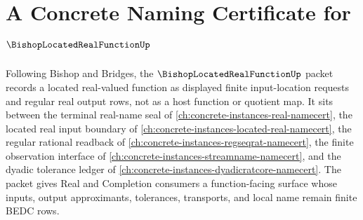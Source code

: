 \chapter{A Concrete Naming Certificate for $\BishopLocatedRealFunctionUp$}
\label{ch:concrete-instances-bishop-located-real-function-namecert}

Following Bishop and Bridges, the $\BishopLocatedRealFunctionUp$ packet records a located real-valued function as displayed finite input-location requests and regular real output rows, not as a host function or quotient map. It sits between the terminal real-name seal of \autoref{ch:concrete-instances-real-namecert}, the located real input boundary of \autoref{ch:concrete-instances-located-real-namecert}, the regular rational readback of \autoref{ch:concrete-instances-regseqrat-namecert}, the finite observation interface of \autoref{ch:concrete-instances-streamname-namecert}, and the dyadic tolerance ledger of \autoref{ch:concrete-instances-dyadicratcore-namecert}. The packet gives Real and Completion consumers a function-facing surface whose inputs, output approximants, tolerances, transports, and local name remain finite BEDC rows.

